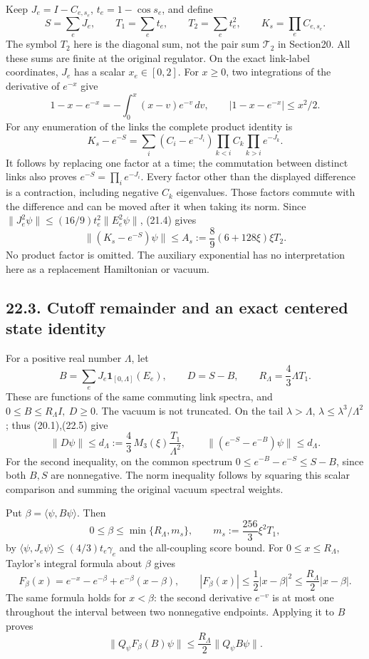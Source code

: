 \documentclass[
]{article}
\begin{document}
Keep \(J_e=I-C_{e,s_e}\), \(t_e=1-\cos s_e\), and define \[
S=\sum_eJ_e,\qquad T_1=\sum_et_e,\qquad T_2=\sum_et_e^2,
\qquad K_s=\prod_eC_{e,s_e}.
\] The symbol \(T_2\) here is the diagonal sum, not the pair sum
\(\mathcal T_2\) in Section20. All these sums are finite at the original
regulator. On the exact link-label coordinates, \(J_e\) has a scalar
\(x_e\in[0,2]\). For \(x\ge0\), two integrations of the derivative of
\(e^{-x}\) give \[
1-x-e^{-x}=-\int_0^x(x-v)e^{-v}\,dv,\qquad
|1-x-e^{-x}|\le x^2/2 .
\] For any enumeration of the links the complete product identity is \[
K_s-e^{-S}
 =\sum_i(C_i-e^{-J_i})
          \prod_{k<i}C_k\prod_{k>i}e^{-J_k}.
                                                               \tag{22.6}
\] It follows by replacing one factor at a time; the commutation between
distinct links also proves \(e^{-S}=\prod_i e^{-J_i}\). Every factor
other than the displayed difference is a contraction, including negative
\(C_k\) eigenvalues. Those factors commute with the difference and can
be moved after it when taking its norm. Since
\(\|J_e^2\psi\|\le(16/9)t_e^2\|E_e^2\psi\|\), (21.4) gives \[
\|(K_s-e^{-S})\psi\|
 \le A_s:=\frac89(6+128\xi)\xi T_2 .                            \tag{22.7}
\] No product factor is omitted. The auxiliary exponential has no
interpretation here as a replacement Hamiltonian or vacuum.

\subsection{22.3. Cutoff remainder and an exact centered state
identity}\label{cutoff-remainder-and-an-exact-centered-state-identity}

For a positive real number \(\Lambda\), let \[
B=\sum_eJ_e\mathbf1_{[0,\Lambda]}(E_e),\qquad
D=S-B,\qquad R_\Lambda=\frac43\Lambda T_1 .
\] These are functions of the same commuting link spectra, and
\(0\le B\le R_\Lambda I,\ D\ge0\). The vacuum is not truncated. On the
tail \(\lambda>\Lambda\), \(\lambda\le\lambda^3/\Lambda^2\); thus
(20.1),(22.5) give \[
\|D\psi\|\le d_\Lambda:=
 \frac43\,M_3(\xi)\frac{T_1}{\Lambda^2},\qquad
\|(e^{-S}-e^{-B})\psi\|\le d_\Lambda .                         \tag{22.8}
\] For the second inequality, on the common spectrum
\(0\le e^{-B}-e^{-S}\le S-B\), since both \(B,S\) are nonnegative. The
norm inequality follows by squaring this scalar comparison and summing
the original vacuum spectral weights.

Put \(\beta=\langle\psi,B\psi\rangle\). Then \[
0\le\beta\le\min\{R_\Lambda,m_s\},\qquad
m_s:=\frac{256}{3}\xi^2T_1,                                  \tag{22.9}
\] by \(\langle\psi,J_e\psi\rangle\le(4/3)t_e\gamma_e\) and the
all-coupling score bound. For \(0\le x\le R_\Lambda\), Taylor's integral
formula about \(\beta\) gives \[
F_\beta(x)=e^{-x}-e^{-\beta}+e^{-\beta}(x-\beta),\qquad
|F_\beta(x)|\le\frac12|x-\beta|^2
             \le\frac{R_\Lambda}{2}|x-\beta|.
\] The same formula holds for \(x<\beta\): the second derivative
\(e^{-v}\) is at most one throughout the interval between two
nonnegative endpoints. Applying it to \(B\) proves \[
\|Q_\psi F_\beta(B)\psi\|
 \le\frac{R_\Lambda}{2}\|Q_\psi B\psi\| .
                                                               \tag{22.10}
\]
\end{document}
